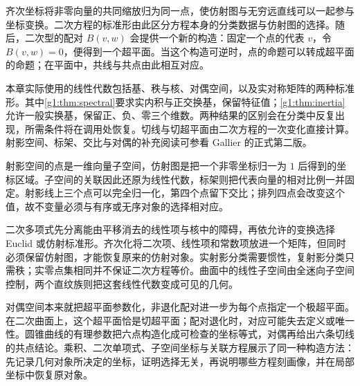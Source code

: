 \ProseParagraphBreak

齐次坐标将非零向量的共同缩放归为同一点，使仿射图与无穷远直线可以一起参与坐标变换。二次方程的标准形由此区分方程本身的分类数据与仿射图的选择。随后，二次型的配对 \(B(v,w)\) 会提供一个新的构造：固定一个点的代表 \(v\)，令 \(B(v,w)=0\)，便得到一个超平面。当这个构造可逆时，点的命题可以转成超平面的命题；在平面中，共线与共点由此相互对应。

\ProseParagraphBreak

本章实际使用的线性代数包括基、秩与核、对偶空间，以及实对称矩阵的两种标准形。其中\cref{g1:thm:spectral}要求实内积与正交换基，保留特征值；\cref{g1:thm:inertia}允许一般实换基，保留正、负、零三个维数。两种结果的区别会在分类中反复出现，所需条件将在调用处恢复。切线与切超平面由二次方程的一次变化直接计算。射影空间、标架、交比与对偶的补充阅读可参看 Gallier 的正式第二版\cite[第5.2--5.9, 5.11节]{Gallier2011Geometric}。








\begin{chaptersummary}
	射影空间的点是一维向量子空间，仿射图是把一个非零坐标归一为 \(1\) 后得到的坐标区域。子空间的关联因此还原为线性代数，标架则把代表向量的相对比例一并固定。射影线上三个点可以完全归一化，第四个点留下交比；排列四点会改变这个值，故不变量必须与有序或无序对象的选择相对应。

	\ProseParagraphBreak

	二次多项式先分离能由平移消去的线性项与核中的障碍，再依允许的变换选择 Euclid 或仿射标准形。齐次化将二次项、线性项和常数项放进一个矩阵，但同时必须保留仿射图，才能恢复原来的仿射对象。实射影分类需要惯性，复射影分类只需秩；实零点集相同并不保证二次方程等价。曲面中的线性子空间由全迷向子空间控制，两个直纹族则把这套线性代数变成可见的几何。

	\ProseParagraphBreak

	对偶空间本来就把超平面参数化，非退化配对进一步为每个点指定一个极超平面。在二次曲面上，这个超平面恰是切超平面；配对退化时，对应可能失去定义或唯一性。圆锥曲线的有理参数把六点构造化成可检查的坐标等式，对偶再给出六条切线的共点结论。乘积、二次单项式、子空间坐标与关联方程展示了同一种构造方法：先记录几何对象所决定的坐标，证明选择无关，再说明哪些方程刻画像，并在局部坐标中恢复原对象。
\end{chaptersummary}

\BookExercises

